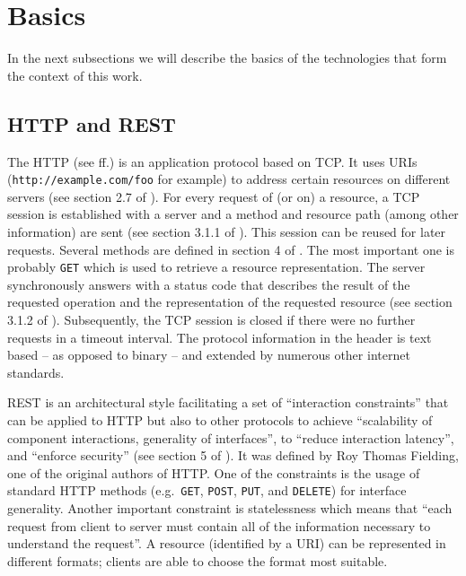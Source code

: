 \section{Basics}

	In the next subsections we will describe the basics of the technologies
	that form the context of this work.

	\subsection{\acs{HTTP} and \acs{REST}}

		The \acl{HTTP} (see \cite{http-0} ff.) is an application protocol based
		on \ac{TCP}. It uses \acp{URI} (\texttt{http://example.com/foo} for
		example) to address certain resources on different servers (see section
		2.7 of \cite{http-0}). For every request of (or on) a resource, a
		\ac{TCP} session is established with a server and a method and resource
		path (among other information) are sent (see section 3.1.1 of
		\cite{http-0}). This session can be reused for later requests. Several
		methods are defined in section 4 of \cite{http-1}. The most important
		one is probably \texttt{GET} which is used to retrieve a resource
		representation. The server synchronously answers with a status code
		that describes the result of the requested operation and the
		representation of the requested resource (see section 3.1.2 of
		\cite{http-0}). Subsequently, the \ac{TCP} session is closed if there
		were no further requests in a timeout interval. The protocol
		information in the header is text based -- as opposed to binary -- and
		extended by numerous other internet standards.

		\acf{REST} is an architectural style facilitating a set of
		\enquote{interaction constraints} that can be applied to \ac{HTTP} but
		also to other protocols to achieve \enquote{scalability of component
		interactions, generality of interfaces}, to \enquote{reduce interaction
		latency}, and \enquote{enforce security} (see section 5 of
		\cite{rest}). It was defined by Roy Thomas Fielding, one of the
		original authors of \ac{HTTP}. One of the constraints is the usage of
		standard \ac{HTTP} methods (e.g.\ \texttt{GET}, \texttt{POST},
		\texttt{PUT}, and \texttt{DELETE}) for interface generality. Another
		important constraint is statelessness which means that \enquote{each
		request from client to server must contain all of the information
		necessary to understand the request}. A resource (identified by a
		\ac{URI}) can be represented in different formats; clients are able to
		choose the format most suitable.

